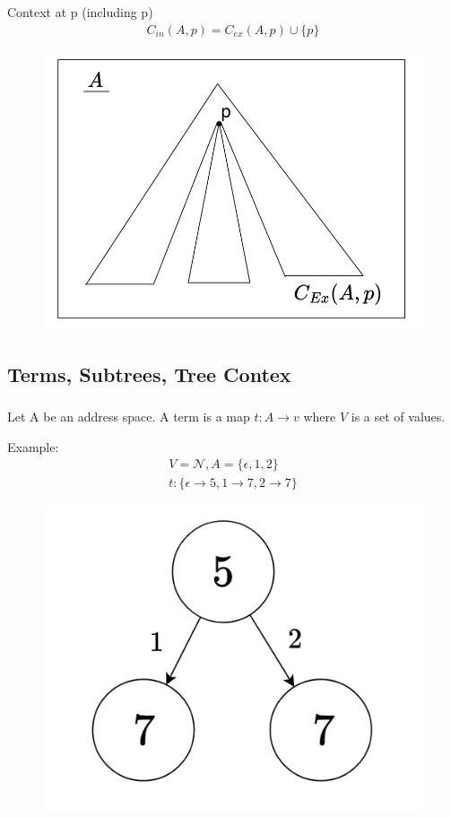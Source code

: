 Context at p (including p)
\begin{gather}
    C_{in}(A, p) = C_{ex}(A,p) \cup \{p\}
\end{gather}
\begin{figure}[htbp]
    \center
    \includegraphics[scale=0.5]{images/popl-4-2.png}
    \caption{}
\end{figure}

\subsection{Terms, Subtrees, Tree Contex}
\subsubsection{}
Let A be an address space. A term is a map $t:A\xrightarrow{}v$ where $V$ is a set of values.

Example:
\begin{gather}
    V = \mathcal{N}, A = \{\epsilon, 1, 2\}\\
    t: \{\epsilon\xrightarrow{}5, 1\xrightarrow{}7, 2\xrightarrow{}7\}
\end{gather}

\begin{figure}[htbp]
    \center
    \includegraphics[scale=0.6]{images/popl-4-3.png}
    \caption{}
\end{figure}

